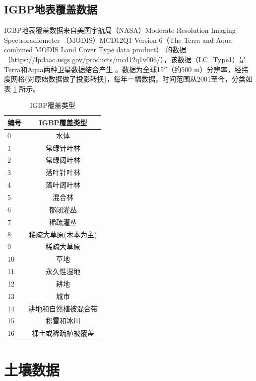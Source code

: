 \subsection{IGBP地表覆盖数据}\label{IGBP地表覆盖数据}
IGBP地表覆盖数据来自美国宇航局（NASA）Moderate Resolution Imaging Spectroradiometer 
（MODIS）MCD12Q1 Version 6（The Terra and Aqua combined MODIS Land Cover Type data product）
的数据（https://lpdaac.usgs.gov/products/mcd12q1v006/），该数据（LC\_Type1）是Terra和Aqua两种卫星数据结合产生 
 \citep{Friedl2019}。数据为全球15$''$（约500 m）分辨率，经纬度网格(对原始数据做了投影转换)，每年一幅数据，时间范围从2001至今，分类如表 \ref{tab:IGBP覆盖类型} 所示。

\begin{table}[]
\centering
\caption{IGBP覆盖类型}
\label{tab:IGBP覆盖类型}
\begin{tabular}{@{}lc@{}}
\toprule
编号 & IGBP覆盖类型     \\ \midrule
0  & 水体           \\
1  & 常绿针叶林           \\
2  & 常绿阔叶林      \\
3  & 落叶针叶林     \\
4  & 落叶阔叶林 \\
5  & 混合林     \\
6  & 郁闭灌丛      \\
7  & 稀疏灌丛           \\
8  & 稀疏大草原(木本为主)         \\
9  & 稀疏大草原     \\
10 & 草地         \\
11 & 永久性湿地        \\
12 & 耕地        \\
13 & 城市        \\
14 & 耕地和自然植被混合带        \\
15 & 积雪和冰川        \\
16 & 裸土或稀疏植被覆盖       \\ \bottomrule
\end{tabular}
\end{table}


\section{土壤数据}\label{土壤数据}
